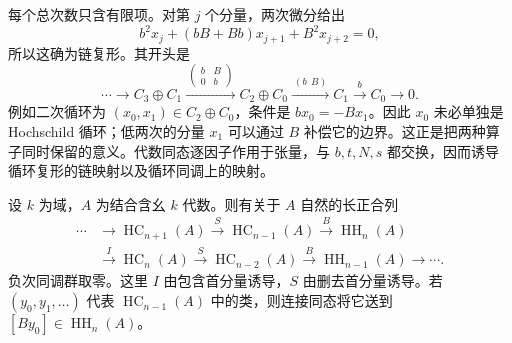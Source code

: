 每个总次数只含有限项。对第 \(j\) 个分量，两次微分给出
\[
	b^2x_j+(bB+Bb)x_{j+1}+B^2x_{j+2}=0,
\]
所以这确为链复形。其开头是
\[
	\cdots\longrightarrow C_3\oplus C_1
	\xrightarrow{\ \left(\begin{smallmatrix}b&B\\0&b\end{smallmatrix}\right)\ }
	C_2\oplus C_0\xrightarrow{\ (b\ \ B)\ }C_1\xrightarrow{\ b\ }C_0\longrightarrow0.
\]
例如二次循环为 \((x_0,x_1)\in C_2\oplus C_0\)，条件是 \(b x_0=-B x_1\)。因此 \(x_0\) 未必单独是 Hochschild 循环；低两次的分量 \(x_1\) 可以通过 \(B\) 补偿它的边界。这正是把两种算子同时保留的意义。代数同态逐因子作用于张量，与 \(b,t,N,s\) 都交换，因而诱导循环复形的链映射以及循环同调上的映射。

\begin{theorem}\label{b4:thm:cyclic-sbi}
	设 \(k\) 为域，\(A\) 为结合含幺 \(k\) 代数。则有关于 \(A\) 自然的长正合列
	\[
		\begin{aligned}
			\cdots&\longrightarrow\operatorname{HC}_{n+1}(A)
			\xrightarrow{S}\operatorname{HC}_{n-1}(A)
			\xrightarrow{B}\operatorname{HH}_n(A)\\
			&\xrightarrow{I}\operatorname{HC}_n(A)
			\xrightarrow{S}\operatorname{HC}_{n-2}(A)
			\xrightarrow{B}\operatorname{HH}_{n-1}(A)\longrightarrow\cdots.
		\end{aligned}
	\]
	负次同调群取零。这里 \(I\) 由包含首分量诱导，\(S\) 由删去首分量诱导。若 \((y_0,y_1,\ldots)\) 代表 \(\operatorname{HC}_{n-1}(A)\) 中的类，则连接同态将它送到 \([B y_0]\in\operatorname{HH}_n(A)\)。
\end{theorem}
